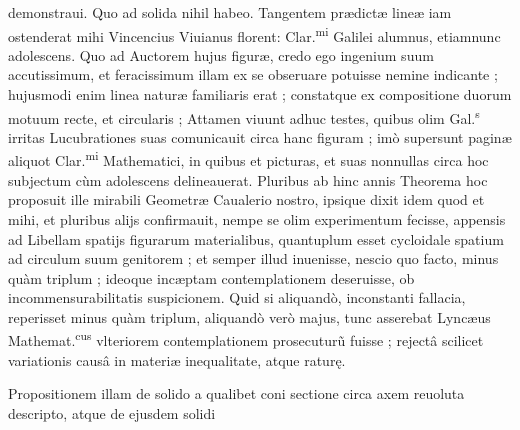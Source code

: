 \documentclass[11pt,a4paper]{article}
\begin{document}

demonstraui. Quo ad solida nihil habeo. Tangentem prædictæ lineæ iam ostenderat mihi Vincencius Viuianus florent: Clar.\textsuperscript{mi} Galilei alumnus, etiamnunc adolescens. Quo ad Auctorem hujus figuræ, credo ego ingenium suum accutissimum, et feracissimum illam ex se obseruare potuisse nemine indicante ; hujusmodi enim linea naturæ familiaris erat ; constatque ex compositione duorum motuum recte, et circularis ; Attamen viuunt adhuc testes, quibus olim Gal.\textsuperscript{s} irritas Lucubrationes suas comunicauit circa hanc figuram ; imò supersunt paginæ aliquot Clar.\textsuperscript{mi} Mathematici, in quibus et picturas, et  suas nonnullas circa hoc subjectum cùm adolescens delineauerat. Pluribus ab hinc annis Theorema hoc proposuit ille mirabili Geometræ Caualerio nostro, ipsique dixit idem quod et mihi, et pluribus alijs confirmauit, nempe se olim experimentum fecisse, appensis ad Libellam spatijs figurarum materialibus, quantuplum esset cycloidale spatium ad circulum suum genitorem ; et semper illud inuenisse, nescio quo facto, minus quàm triplum ; ideoque incæptam contemplationem deseruisse, ob incommensurabilitatis suspicionem. Quid si aliquandò, inconstanti fallacia, reperisset minus quàm triplum, aliquandò verò majus, tunc asserebat Lyncæus Mathemat.\textsuperscript{cus} vlteriorem contemplationem prosecuturũ fuisse ; rejectâ scilicet variationis causâ in materiæ inequalitate, atque raturę.

Propositionem illam de solido a qualibet coni sectione circa axem reuoluta descripto, atque de ejusdem solidi
\end{document}

